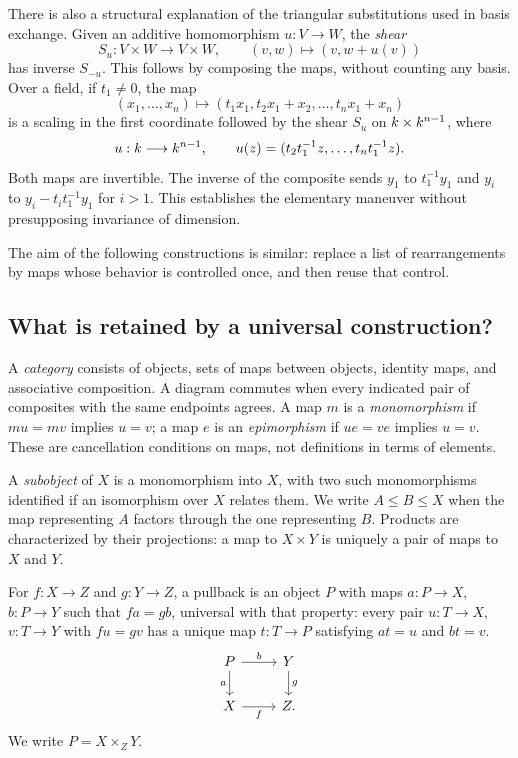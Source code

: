 There is also a structural explanation of the triangular substitutions
used in basis exchange. Given an additive homomorphism $u:V\to W$, the
\emph{shear}
\[
S_u:V\times W\longrightarrow V\times W,
\qquad (v,w)\longmapsto(v,w+u(v))
\]
has inverse $S_{-u}$. This follows by composing the maps, without counting
any basis. Over a field, if $t_1\ne0$, the map
\[
(x_1,\ldots,x_n)\longmapsto
(t_1x_1,t_2x_1+x_2,\ldots,t_nx_1+x_n)
\]
is a scaling in the first coordinate followed by the shear $S_u$ on
$k\times k^{n-1}$, where
\[
u:k\longrightarrow k^{n-1},\qquad
u(z)=(t_2t_1^{-1}z,\ldots,t_nt_1^{-1}z).
\]
Both maps are invertible. The inverse of the composite sends $y_1$ to
$t_1^{-1}y_1$ and $y_i$ to
$y_i-t_i t_1^{-1}y_1$ for $i>1$. This establishes the elementary maneuver
without presupposing invariance of dimension.

The aim of the following constructions is similar: replace a list of
rearrangements by maps whose behavior is controlled once, and then reuse
that control.

\subsection{What is retained by a universal construction?}

A \emph{category} consists of objects, sets of maps between objects,
identity maps, and associative composition. A diagram commutes when
every indicated pair of composites with the same endpoints agrees.
A map $m$ is a \emph{monomorphism} if $mu=mv$ implies $u=v$; a map $e$
is an \emph{epimorphism} if $ue=ve$ implies $u=v$. These are cancellation
conditions on maps, not definitions in terms of elements.

A \emph{subobject} of $X$ is a monomorphism into $X$, with two such
monomorphisms identified if an isomorphism over $X$ relates them. We
write $A\leq B\leq X$ when the map representing $A$ factors through the
one representing $B$. Products are characterized by their projections:
a map to $X\times Y$ is uniquely a pair of maps to $X$ and $Y$.

\begin{definition}[Pullback]
For $f:X\to Z$ and $g:Y\to Z$, a pullback is an object $P$ with maps
$a:P\to X$, $b:P\to Y$ such that $fa=gb$, universal with that property:
every pair $u:T\to X$, $v:T\to Y$ with $fu=gv$ has a unique map
$t:T\to P$ satisfying $at=u$ and $bt=v$.
\[
\begin{tikzcd}
P \arrow[r,"b"] \arrow[d,"a"'] & Y \arrow[d,"g"]\\
X \arrow[r,"f"'] & Z.
\end{tikzcd}
\]
We write $P=X\times_ZY$.
\end{definition}

